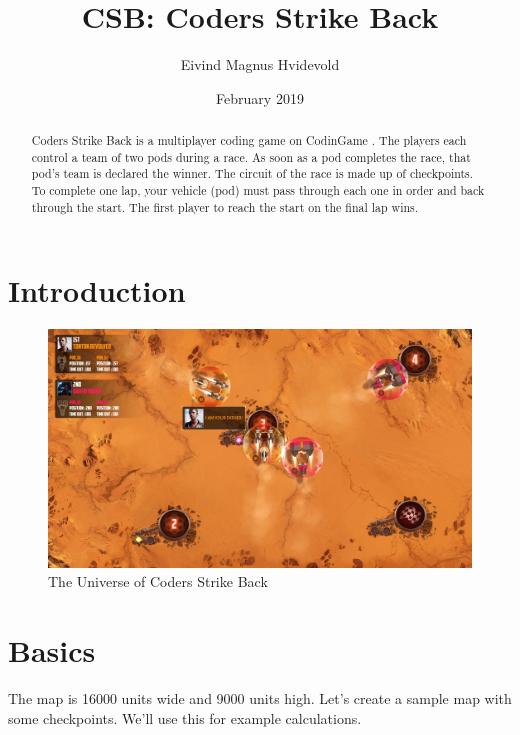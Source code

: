 \documentclass{article}
\title{CSB: Coders Strike Back}
\author{Eivind Magnus Hvidevold}
\date{February 2019}
\begin{document}
\maketitle

\begin{abstract}
\noindent Coders Strike Back is a multiplayer coding game on CodinGame \citep{codingame}.
The players each control a team of two pods during a race.
As soon as a pod completes the race, that pod's team is declared the winner.
The circuit of the race is made up of checkpoints.
To complete one lap, your vehicle (pod) must pass through each one in order and back through the start.
The first player to reach the start on the final lap wins.
\end{abstract}

\section{Introduction}

\begin{figure}[h!]
\centering
\includegraphics[scale=0.15]{csb-intro.jpg}
\caption{The Universe of Coders Strike Back}
\label{threadsVsSync}
\end{figure}

\section{Basics}

\par
The map is 16000 units wide and 9000 units high.
Let's create a sample map with some checkpoints.
We'll use this for example calculations.





\end{document}
